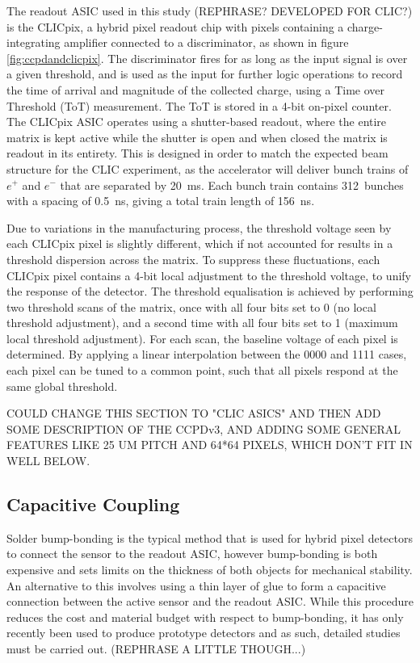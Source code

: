 The readout ASIC used in this study (REPHRASE? DEVELOPED FOR CLIC?) is the CLICpix, a hybrid pixel readout chip with pixels containing a charge-integrating amplifier connected to a discriminator, as shown in figure \ref{fig:ccpdandclicpix}.  The discriminator fires for as long as the input signal is over a given threshold, and is used as the input for further logic operations to record the time of arrival and magnitude of the collected charge, using a Time over Threshold (ToT) measurement. The ToT is stored in a 4-bit on-pixel counter.  The CLICpix ASIC operates using a shutter-based readout, where the entire matrix is kept active while the shutter is open and when closed the matrix is readout in its entirety.  This is designed in order to match the expected beam structure for the CLIC experiment, as the accelerator will deliver bunch trains of $e^{+}$ and $e^{-}$ that are separated by 20~ms.  Each bunch train contains 312~bunches with a spacing of 0.5~ns, giving a total train length of 156~ns.  

Due to variations in the manufacturing process, the threshold voltage seen by each CLICpix pixel is slightly different, which if not accounted for results in a threshold dispersion across the matrix. To suppress these fluctuations, each CLICpix pixel contains a 4-bit local adjustment to the threshold voltage, to unify the response of the detector. The threshold equalisation is achieved by performing two threshold scans of the matrix, once with all four bits set to 0 (no local threshold adjustment), and a second time with all four bits set to 1 (maximum local threshold adjustment). For each scan, the baseline voltage of each pixel is determined. By applying a linear interpolation between the 0000 and 1111 cases, each pixel can be tuned to a common point, such that all pixels respond at the same global threshold.

COULD CHANGE THIS SECTION TO "CLIC ASICS" AND THEN ADD SOME DESCRIPTION OF THE CCPDv3, AND ADDING SOME GENERAL FEATURES LIKE 25 UM PITCH AND 64*64 PIXELS, WHICH DON'T FIT IN WELL BELOW.


\subsection{Capacitive Coupling}

Solder bump-bonding is the typical method that is used for hybrid pixel detectors to connect the sensor to the readout ASIC, however bump-bonding is both expensive and sets limits on the thickness of both objects for mechanical stability.  An alternative to this involves using a thin layer of glue to form a capacitive connection between the active sensor and the readout ASIC.  While this procedure reduces the cost and material budget with respect to bump-bonding, it has only recently been used to produce prototype detectors and as such, detailed studies must be carried out. (REPHRASE A LITTLE THOUGH...)

